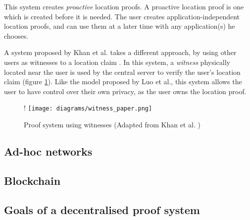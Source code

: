 This system creates \textit{proactive} location proofs. A proactive location proof is one which is created before it is needed. The user creates application-independent location proofs, and can use them at a later time with any application(s) he chooses.

A system proposed by Khan et al. takes a different approach, by using other users as witnesses to a location claim \cite{khan}. In this system, a \textit{witness} physically located near the user is used by the central server to verify the user's location claim (figure \ref{fig:witness_paper}). Like the model proposed by Luo et al., this system allows the user to have control over their own privacy, as the user owns the location proof.

\begin{figure}[H]
\begin{center}
 {!} {\texttt{[image: diagrams/witness\_paper.png]}}
\caption{Proof system using witnesses (Adapted from Khan et al. \cite{khan})}
\label{fig:witness_paper}
\end{center}
\end{figure}

\subsection{Ad-hoc networks}

\subsection{Blockchain}

\subsection{Goals of a decentralised proof system}